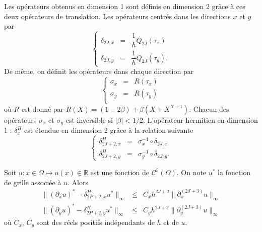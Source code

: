 Les opérateurs obtenus en dimension 1 sont définis en dimension 2 grâce à ces deux opérateurs de translation. Les opérateurs centrés dans les directions $x$ et $y$ par 
\begin{equation}
\left\lbrace
\begin{array}{rcl}
\delta_{2J,x} & = & \dfrac{1}{h} Q_{2J}(\tau_x) \\
\delta_{2J,y} & = & \dfrac{1}{h} Q_{2J}(\tau_y).
\end{array}
\right.
\label{eq:der_centrée_2D}
\end{equation}
De même, on définit les opérateurs dans chaque direction par 
\begin{equation}
\left\lbrace
\begin{array}{rcl}
\sigma_x & = & R(\tau_x) \\
\sigma_y & = & R(\tau_y) \\
\end{array}
\right.
\label{eq:simpson_2D}
\end{equation}
où $R$ est donné par $R(X) = (1-2 \beta) + \beta (X+X^{N-1})$.
Chacun des opérateurs $\sigma_x$ et $\sigma_y$ est inversible si $|\beta|<1/2$.
L'opérateur hermitien en dimension 1 : $\delta_x^H$ est étendue en dimension 2 grâce à la relation suivante 
\begin{equation}
\left\lbrace
\begin{array}{rcl}
\delta_{2J+2,x}^H & = & \sigma_x^{-1} \circ \delta_{2J,x} \\
\delta_{2J+2,y}^H & = & \sigma_y^{-1} \circ \delta_{2J,y}.
\end{array}
\right.
\label{eq:der_herm_2D}
\end{equation}

\begin{theoreme}
Soit $u : x \in \Omega \mapsto u(x) \in \mathbb{R}$ est une fonction de $\mathcal{C}^5 (\Omega)$. On note $u^*$ la fonction de grille associée à $u$. Alors
\begin{equation}
\begin{array}{rcl}
\|(\partial_x u)^* - \delta_{2P+2,x}^H u^*\|_{\infty} & \leq & C_x h^{2J+2} \| \partial_x^{(2J+3)}u \|_{\infty}\\
\|(\partial_y u)^* - \delta_{2P+2,y}^H u^*\|_{\infty} &\leq & C_y h^{2J+2} \| \partial_y^{(2J+3)}u \|_{\infty}
\end{array}
\end{equation}
où $C_x$, $C_y$ sont des réels positifs indépendants de $h$ et de $u$.
\end{theoreme}

